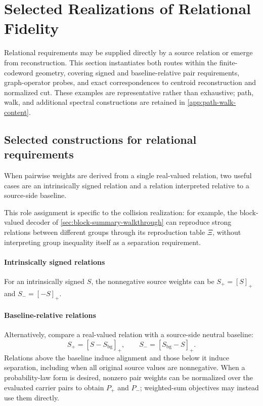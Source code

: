 \section{Selected Realizations of Relational Fidelity}
\label{sec:relational-distortion-realizations}

Relational requirements may be supplied directly by a source relation or emerge from reconstruction.
This section instantiates both routes within the finite-codeword geometry, covering signed and baseline-relative pair requirements, graph-operator probes, and exact correspondences to centroid reconstruction and normalized cut.
These examples are representative rather than exhaustive; path, walk, and additional spectral constructions are retained in \ref{app:path-walk-content}.

\subsection{Selected constructions for relational requirements}

When pairwise weights are derived from a single real-valued relation, two useful cases are an intrinsically signed relation and a relation interpreted relative to a source-side baseline.

This role assignment is specific to the collision realization: for example, the block-valued decoder of \cref{sec:block-summary-walkthrough} can reproduce strong relations between different groups through its reproduction table $\Xi$, without interpreting group inequality itself as a separation requirement.

\paragraph{Intrinsically signed relations}
For an intrinsically signed $S$, the nonnegative source weights can be $S_+=[S]_+$ and $S_-=[-S]_+$.

\paragraph{Baseline-relative relations}
Alternatively, compare a real-valued relation with a source-side neutral baseline:
\begin{equation}
S_+=[S-S_{\mathrm{bg}}]_+,\qquad
S_-=[S_{\mathrm{bg}}-S]_+.
\label{eq:signed-relation}
\end{equation}
Relations above the baseline induce alignment and those below it induce separation, including when all original source values are nonnegative.
When a probability-law form is desired, nonzero pair weights can be normalized over the evaluated carrier pairs to obtain $P_+$ and $P_-$; weighted-sum objectives may instead use them directly.

